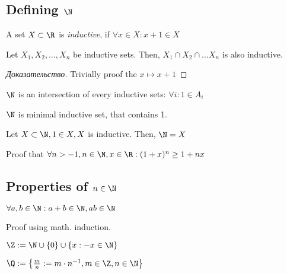 \subsection{Defining $\N$}

\begin{definition}
	A set $X \subset \R$ is \textit{inductive}, if $\forall x \in X: x + 1 \in X$
\end{definition}

\begin{lemma}
	Let $X_1, X_2, \dots , X_n$ be inductive sets. Then, $X_1 \cap X_2 \cap \dots X_n$ is also inductive.
\end{lemma}

\begin{proof}[Доказательство]
	Trivially proof the $x \mapsto x+1$
\end{proof}
\begin{definition}[]
	$\N$ is an intersection of every inductive sets: $\forall i: 1 \in A_i$
\end{definition}
\begin{note}[]
	$\N$ is minimal inductive set, that contains 1.
\end{note}

\begin{theorem}
	Let $X \subset \N, 1 \in X, X$ is inductive. Then, $\N = X$
\end{theorem}

\begin{exercise}
	Proof that $\forall n > -1, n \in \N, x \in \R: (1 + x)^{n} \geq 1 + nx$
\end{exercise}

\subsection{Properties of $n \in \N$}

\begin{lemma}
	$\forall a,b \in \N: a + b \in \N, ab \in \N$
\end{lemma}

\begin{note}[]
	Proof using math. induction.
\end{note}

\begin{definition}[$\Z$]
	$\Z := \N  \cup \left\{ 0 \right \} \cup \{x : -x \in \N\}$
\end{definition}

\begin{definition}[$\Q$]
	$\Q := \left\{ \frac{m}{n} := m \cdot n^{-1}, m \in \Z, n \in \N \right \} $	
\end{definition}

